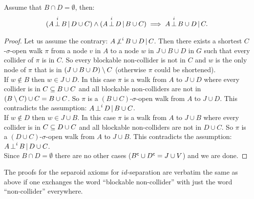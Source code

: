 \begin{Lem} Assume that $B \cap D = \emptyset$, then:
    \[ (A \operatorname*{\perp}^i  B \operatorname*{|} D \cup  C) \land (A \operatorname*{\perp}^i  D \operatorname*{|} B \cup C) \implies A  \operatorname*{\perp}^i  B \cup D \operatorname*{|}   C.\]
\begin{proof}
    Let us assume the contrary:  $A \operatorname*{\not\perp}^i  B \cup D \operatorname*{|} C$.
    Then there exists a shortest $C$-$\sigma$-open walk $\pi$ 
    from a node $v$ in $A$ to a node $w$ in $J \cup B \cup D $ in $G$ such that every collider of $\pi$ is in $C$.
    So every blockable non-collider is not in $C$ and $w$ is 
    the only node of $\pi$ that is in $(J \cup B \cup D) \setminus C$ (otherwise $\pi$ could be shortened). \\
    If $w \notin B$ then $w \in J \cup D$. In this case $\pi$ is a walk from $A$ to $J \cup D$ where every collider is in
    $C \subseteq B \cup C$ and all blockable non-colliders are not in $(B\setminus C) \cup C = B \cup C$. 
    So $\pi$ is a $(B \cup C)$-$\sigma$-open walk from $A$ to $J \cup D$.
    This contradicts the assumption: $A \operatorname*{\perp}^i  D \operatorname*{|} B \cup C$.\\
    If $w \notin D$ then $w \in J \cup B$. In this case $\pi$ is a walk from $A$ to $J \cup B$ where every collider is in
    $C \subseteq D \cup C$ and all blockable non-colliders are not in $D \cup C$. 
    So $\pi$ is a $(D \cup C)$-$\sigma$-open walk from $A$ to $J \cup B$.
    This contradicts the assumption: $A \operatorname*{\perp}^i  B \operatorname*{|} D \cup  C$.\\
    Since $B \cap D = \emptyset$ there are no other cases ($B^{\mathsf{c}} \cup D^{\mathsf{c}} = J \cup V$) and we are done.
\end{proof}
\end{Lem}


\begin{Rem}
    The proofs for the separoid axioms for $id$-separation are verbatim the same as above if one exchanges the word ``blockable non-collider'' with just the word ``non-collider'' everywhere.
\end{Rem}

